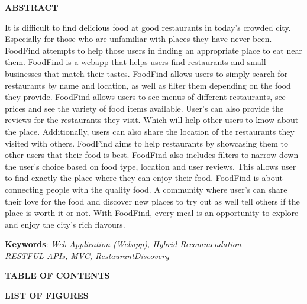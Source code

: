 \documentclass[12pt, a4paper, oneside]{article}
\begin{document}
\large
\begin{center}
	\textbf{ABSTRACT}
\end{center}
\normalsize
It is difficult to find delicious food at good restaurants in today's crowded city. Especially for those who are unfamiliar with places they have never been. FoodFind attempts to help those users in finding an appropriate place to eat near them. FoodFind is a webapp that helps users find restaurants and small businesses that match their tastes. FoodFind allows users to simply search for restaurants by name and location, as well as filter them depending on the food they provide. FoodFind allows users to see menus of different restaurants, see prices and see the variety of food items available. User's can also provide the reviews for the restaurants they visit. Which will help other users to know about the place. Additionally, users can also share the location of the restaurants they visited with others. FoodFind aims to help restaurants by showcasing them to other users that their food is best. FoodFind also includes filters to narrow down the user's choice based on food type, location and user reviews. This allows user to find exactly the place where they can enjoy their food. FoodFind is about connecting people with the quality food. A community where user's can share their love for the food and discover new places to try out as well tell others if the place is worth it or not. With FoodFind, every meal is an opportunity to explore and enjoy the city's rich flavours. 

\textbf{Keywords}: \textit{Web Application (Webapp), Hybrid Recommendation\\ 
RESTFUL APIs, MVC, RestaurantDiscovery}\\
\pagebreak
\break

\large
{}
\begin{center}
	\textbf{TABLE OF CONTENTS}
\end{center}
\normalsize
\setlength{\cftbeforetoctitleskip}{0pt}
\renewcommand{\contentsname}{}
\tableofcontents
\break


\large
{}
\begin{center}
	\textbf{LIST OF FIGURES}
\end{center}
\renewcommand{\cftfigpresnum}{Figure }
\setlength{\cftfignumwidth}{5em}
\normalsize
\renewcommand\listfigurename{}
\listoffigures

\break
\end{document}

